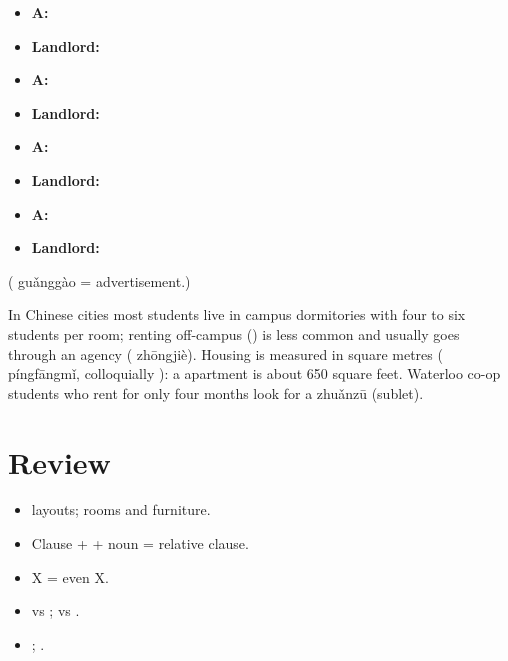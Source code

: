 \begin{example}\leavevmode
\begin{itemize}
  \item \textbf{A:} 
  \item \textbf{Landlord:} 
  \item \textbf{A:} 
  \item \textbf{Landlord:} 
  \item \textbf{A:} 
  \item \textbf{Landlord:} 
  \item \textbf{A:} 
  \item \textbf{Landlord:} 
\end{itemize}
( guǎnggào = advertisement.)
\end{example}

\begin{aside}
In Chinese cities most students live in campus dormitories with four to six students
per room; renting off-campus () is less common and usually goes through an
agency ( zhōngjiè). Housing is measured in square metres (
píngfāngmǐ, colloquially ): a  apartment is about 650 square feet.
Waterloo co-op students who rent for only four months look for a  zhuǎnzū
(sublet).
\end{aside}

\section*{Review}
\begin{itemize}
  \item {} layouts; rooms and furniture.
  \item Clause +  + noun = relative clause.
  \item {} X  = even X.
  \item {} vs ;  vs .
  \item {}; .
\end{itemize}
